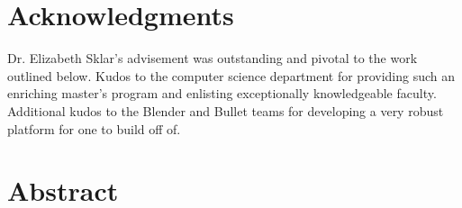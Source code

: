 \documentclass{book}[11pt]
\newcommand\todo[1]{\textcolor{red}{\textbf{{\tt TODO: #1}}}}
\begin{document}


  \newpage
  
  
  
  \section*{Acknowledgments}
  
  Dr. Elizabeth Sklar's advisement was outstanding and pivotal to the work outlined below. Kudos to the computer science department for providing such an enriching master's program and enlisting exceptionally knowledgeable faculty. Additional kudos to the Blender and Bullet teams for developing a very robust platform for one to build off of.  

  \newpage
  
  
  \section*{Abstract}
  
\end{document}
